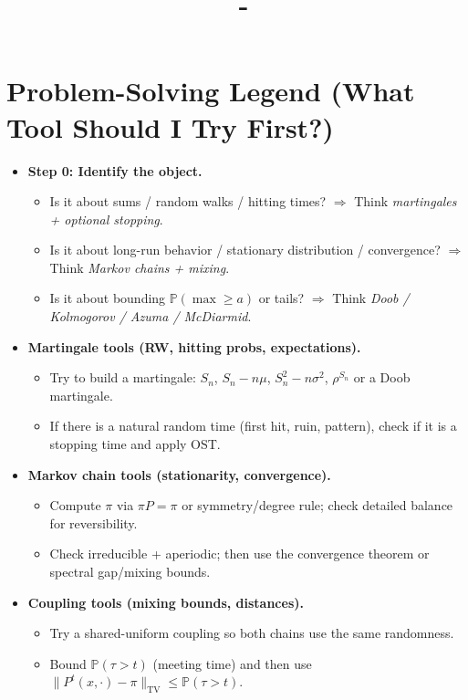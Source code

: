 \documentclass[answers,12pt,addpoints]{exam}
\author{\name}
\title{\course \ - \assignment}
\begin{document}
\maketitle
\tableofcontents

\newpage

\section*{Problem-Solving Legend (What Tool Should I Try First?)}

\begin{itemize}
  \item \textbf{Step 0: Identify the object.}
  \begin{itemize}
    \item Is it about sums / random walks / hitting times? $\Rightarrow$ Think \emph{martingales + optional stopping}.
    \item Is it about long-run behavior / stationary distribution / convergence? $\Rightarrow$ Think \emph{Markov chains + mixing}.
    \item Is it about bounding $\mathbb{P}(\max \ge a)$ or tails? $\Rightarrow$ Think \emph{Doob / Kolmogorov / Azuma / McDiarmid}.
  \end{itemize}

  \item \textbf{Martingale tools (RW, hitting probs, expectations).}
  \begin{itemize}
    \item Try to build a martingale: $S_n$, $S_n-n\mu$, $S_n^2-n\sigma^2$, $\rho^{S_n}$ or a Doob martingale.
    \item If there is a natural random time (first hit, ruin, pattern), check if it is a stopping time and apply OST.
  \end{itemize}

  \item \textbf{Markov chain tools (stationarity, convergence).}
  \begin{itemize}
    \item Compute $\pi$ via $\pi P=\pi$ or symmetry/degree rule; check detailed balance for reversibility.
    \item Check irreducible + aperiodic; then use the convergence theorem or spectral gap/mixing bounds.
  \end{itemize}

  \item \textbf{Coupling tools (mixing bounds, distances).}
  \begin{itemize}
    \item Try a shared-uniform coupling so both chains use the same randomness.
    \item Bound $\mathbb{P}(\tau>t)$ (meeting time) and then use $\|P^t(x,\cdot)-\pi\|_{\mathrm{TV}}\le \mathbb{P}(\tau>t)$.
  \end{itemize}


\end{itemize}
\end{document}
